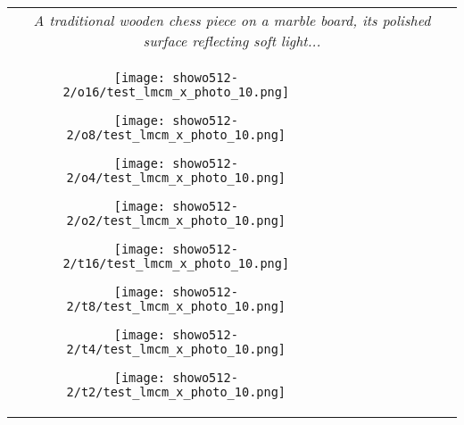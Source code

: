\begin{figure*}[htbp]
\begin{tabular}{cccccccc}
        \multicolumn{8}{c}{\small \textit{A traditional wooden chess piece on a marble board, its polished surface reflecting soft light...}} \\
        \vspace{0.1cm}

        

        \begin{minipage}{0.12\linewidth} 
            \centering
            \texttt{[image: showo512-2/o16/test\_lmcm\_x\_photo\_10.png]}
        \end{minipage} 
        \hspace{-0.15cm} %
        \begin{minipage}{0.12\linewidth} 
            \centering
            \texttt{[image: showo512-2/o8/test\_lmcm\_x\_photo\_10.png]}
        \end{minipage} 
        \hspace{-0.15cm}
        \begin{minipage}{0.12\linewidth} 
            \centering
            \texttt{[image: showo512-2/o4/test\_lmcm\_x\_photo\_10.png]}
        \end{minipage} 
        \hspace{-0.15cm}
        \begin{minipage}{0.12\linewidth} 
            \centering
            \texttt{[image: showo512-2/o2/test\_lmcm\_x\_photo\_10.png]}
        \end{minipage} 
        \hspace{0cm}
        \begin{minipage}{0.12\linewidth} 
            \centering
            \texttt{[image: showo512-2/t16/test\_lmcm\_x\_photo\_10.png]}
        \end{minipage} 
        \hspace{-0.15cm}
        \begin{minipage}{0.12\linewidth} 
            \centering
            \texttt{[image: showo512-2/t8/test\_lmcm\_x\_photo\_10.png]}
        \end{minipage} 
        \hspace{-0.15cm}
        \begin{minipage}{0.12\linewidth} 
            \centering
            \texttt{[image: showo512-2/t4/test\_lmcm\_x\_photo\_10.png]}
        \end{minipage} 
        \hspace{-0.15cm}
        \begin{minipage}{0.12\linewidth} 
            \centering
            \texttt{[image: showo512-2/t2/test\_lmcm\_x\_photo\_10.png]}
        \end{minipage} \\


\end{tabular}
\end{figure*}
